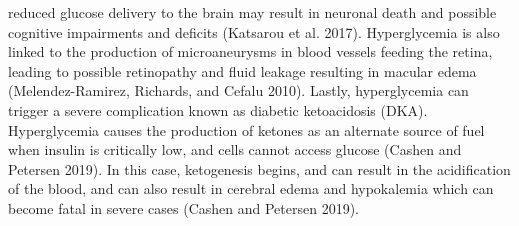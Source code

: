\documentclass{article}
\begin{document}
reduced glucose delivery to the brain may result in neuronal death and possible cognitive impairments and deficits (Katsarou
et al. 2017). Hyperglycemia is also linked to the production of microaneurysms in blood vessels feeding the retina, leading
to possible retinopathy and fluid leakage resulting in macular edema (Melendez-Ramirez, Richards, and Cefalu 2010). Lastly,
hyperglycemia can trigger a severe complication known as diabetic ketoacidosis (DKA). Hyperglycemia causes the production
of ketones as an alternate source of fuel when insulin is critically low, and cells cannot access glucose (Cashen and Petersen
2019). In this case, ketogenesis begins, and can result in the acidification of the blood, and can also result in cerebral edema
and hypokalemia which can become fatal in severe cases (Cashen and Petersen 2019).
\end{document}
